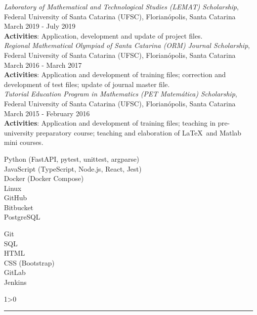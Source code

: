 \documentclass[a4paper,10pt]{article}
\newcommand{\createSection}[4][0]{
	\begin{tcolorbox}[
        blanker,
        breakable,
        title=\begin{minipage}{0.16\linewidth}\large{\textbf{#2}}\vspace{-#3\baselineskip}\end{minipage},
        coltitle=black,
        leftupper=0.21\linewidth,
    ]
        #4
		\ifnum0#1>0 { \hrule {\ } } \fi
    \end{tcolorbox}
}
\begin{document}
{		\textit{Laboratory of Mathematical and Technological Studies (LEMAT) Scholarship}, Federal University of Santa Catarina (UFSC), Florianópolis, Santa Catarina \hfill March 2019 - July 2019 \\
		\textbf{Activities}: Application, development and update of project files.\\

		\textit{Regional Mathematical Olympiad of Santa Catarina (ORM) Journal Scholarship}, Federal University of Santa Catarina (UFSC), Florianópolis, Santa Catarina \hfill March 2016 - March 2017 \\
		\textbf{Activities}: Application and development of training files; correction and development of test files; update of journal master file.\\

		\textit{Tutorial Education Program in Mathematics (PET Matemática) Scholarship}, Federal University of Santa Catarina (UFSC), Florianópolis, Santa Catarina \hfill March 2015 - February 2016 \\
		\textbf{Activities}: Application and development of training files; teaching in pre-university preparatory course; teaching and elaboration of \LaTeX\ and Matlab mini courses.\\
	}

    \createSection[1]{Programming languages and tools}{4}{
        \large{\bf
			\begin{minipage}{0.65\linewidth}
				Python (FastAPI, pytest, unittest, argparse)\\
				JavaScript (TypeScript, Node.js, React, Jest)\\
				Docker (Docker Compose)\\
				Linux\\
				GitHub\\
				Bitbucket\\
				PostgreSQL\\
			\end{minipage}
			\begin{minipage}{0.35\linewidth}
				Git\\
				SQL\\
				HTML\\
				CSS (Bootstrap)\\
				GitLab\\
				Jenkins\\
				\vspace{\baselineskip}
			\end{minipage}
		}
    }
\end{document}

